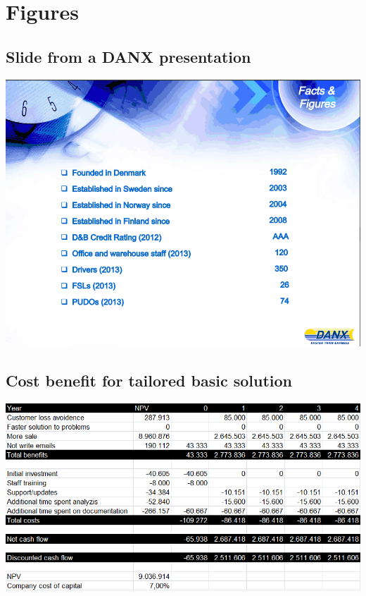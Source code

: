 \chapter{Figures}

\section{Slide from a DANX presentation}
\label{sec:slide_from_DANX}
\includegraphics[width=\textwidth]{img/DANX_FSL_PUDO}

\section{Cost benefit for tailored basic solution}
\label{sec:cost_tailored_basic}
\includegraphics[width=\textwidth]{img/CostBenefit_TailoredBasic2}

